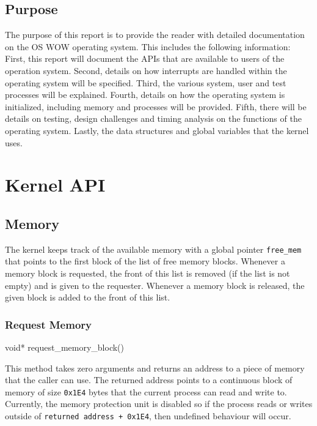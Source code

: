 \documentclass[se]{uw-wkrpt}
\begin{document}
\subsection{Purpose}

The purpose of this report is to provide the reader with detailed documentation on the OS WOW operating system. This includes the following information:  First, this report will document the APIs that are available to users of the operation system. Second, details on how interrupts are handled within the operating system will be specified. Third, the various system, user and test processes will be explained. Fourth, details on how the operating system is initialized, including memory and processes will be provided. Fifth, there will be details on testing, design challenges and timing analysis on the functions of the operating system. Lastly, the data structures and global variables that the kernel uses.

\section{Kernel API} \label{sec:kernel}

\subsection{Memory}

The kernel keeps track of the available memory with a global pointer \texttt{free\_mem} that points to the first block of the list of free memory blocks. Whenever a memory block is requested, the front of this list is removed (if the list is not empty) and is given to the requester. Whenever a memory block is released, the given block is added to the front of this list.

\subsubsection{Request Memory}
\begin{code}
void* request_memory_block()
\end{code}

This method takes zero arguments and returns an address to a piece of memory that the caller can use. The returned address points to a continuous block of memory of size \texttt{0x1E4} bytes that the current process can read and write to. Currently, the memory protection unit is disabled so if the process reads or writes outside of \texttt{returned address + 0x1E4}, then undefined behaviour will occur.
\end{document}
